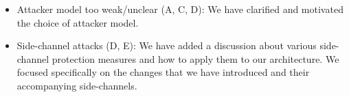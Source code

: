 \documentclass[9pt]{article}
\begin{document}
\begin{itemize}
    \item Attacker model too weak/unclear (A, C, D): {\color{blue} We have clarified and motivated the choice of attacker model. }

    \item Side-channel attacks (D, E): {\color{blue} We have added a discussion about various side-channel protection measures and how to apply them to our architecture. We focused specifically on the changes that we have introduced and their accompanying side-channels.}
\end{itemize}



\end{document}
